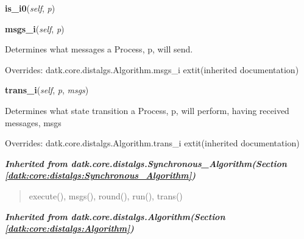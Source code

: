     \vspace{0.5ex}

\hspace{.8\funcindent}\begin{boxedminipage}{\funcwidth}

    \raggedright \textbf{is\_i0}(\textit{self}, \textit{p})

\setlength{\parskip}{2ex}
\setlength{\parskip}{1ex}
    \end{boxedminipage}

    \vspace{0.5ex}

\hspace{.8\funcindent}\begin{boxedminipage}{\funcwidth}

    \raggedright \textbf{msgs\_i}(\textit{self}, \textit{p})

\setlength{\parskip}{2ex}
    Determines what messages a Process, p, will send.

\setlength{\parskip}{1ex}
      Overrides: datk.core.distalgs.Algorithm.msgs\_i 	extit{(inherited documentation)}

    \end{boxedminipage}

    \vspace{0.5ex}

\hspace{.8\funcindent}\begin{boxedminipage}{\funcwidth}

    \raggedright \textbf{trans\_i}(\textit{self}, \textit{p}, \textit{msgs})

\setlength{\parskip}{2ex}
    Determines what state transition a Process, p, will perform, having 
    received messages, msgs

\setlength{\parskip}{1ex}
      Overrides: datk.core.distalgs.Algorithm.trans\_i 	extit{(inherited documentation)}

    \end{boxedminipage}


\large{\textbf{\textit{Inherited from datk.core.distalgs.Synchronous\_Algorithm\textit{(Section \ref{datk:core:distalgs:Synchronous_Algorithm})}}}}

\begin{quote}
execute(), msgs(), round(), run(), trans()
\end{quote}

\large{\textbf{\textit{Inherited from datk.core.distalgs.Algorithm\textit{(Section \ref{datk:core:distalgs:Algorithm})}}}}


